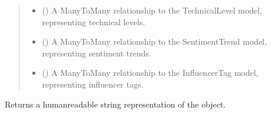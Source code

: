 \documentclass[letterpaper,10pt,english]{sphinxmanual}
\begin{document}
\begin{fulllineitems}
\begin{quote}
\begin{description}
\begin{itemize}
\item {} 
\sphinxAtStartPar
{} () \textendash{} A ManyToMany relationship to the TechnicalLevel model, representing technical levels.

\item {} 
\sphinxAtStartPar
{} () \textendash{} A ManyToMany relationship to the SentimentTrend model, representing sentiment trends.

\item {} 
\sphinxAtStartPar
{} () \textendash{} A ManyToMany relationship to the InfluencerTag model, representing influencer tags.

\end{itemize}

\end{description}\end{quote}

\begin{fulllineitems}
\label{\detokenize{source/meta_models_management:meta_models_management.models.AdditionalMetadata.__str__}}
\pysigstartsignatures
{}
\pysigstopsignatures
\sphinxAtStartPar
Returns a human\sphinxhyphen{}readable string representation of the object.

\end{fulllineitems}



\begin{fulllineitems}

\pysigstartsignatures
{}
\pysigstopsignatures
\end{fulllineitems}



\begin{fulllineitems}

\pysigstartsignatures
{}
\pysigstopsignatures
\end{fulllineitems}


\end{fulllineitems}
\end{document}

